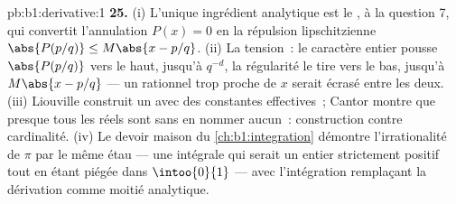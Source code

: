 \begin{solution}{pb:b1:derivative:1}
\textbf{25.} (i) L'unique ingrédient analytique est le , à la question 7, qui convertit l'annulation $P(x) =
0$ en la répulsion lipschitzienne $\abs{P(p/q)} \leq M\abs{x -
p/q}$. (ii) La tension~: le caractère entier pousse $\abs{P(p/q)}$ vers le haut,
jusqu'à $q^{-d}$, la régularité le tire vers le bas, jusqu'à $M\abs{x - p/q}$ --- un
rationnel trop proche de $x$ serait écrasé entre les deux.
(iii) Liouville construit un  avec des constantes effectives~;
Cantor montre que presque tous les réels sont  sans en nommer
aucun~: construction contre cardinalité. (iv) Le
devoir maison du \cref{ch:b1:integration} démontre
l'irrationalité de $\pi$ par le même étau --- une intégrale qui
serait un entier strictement positif tout en étant piégée dans $\intoo{0}{1}$ ---
avec l'intégration remplaçant la dérivation comme moitié analytique.
\end{solution}
